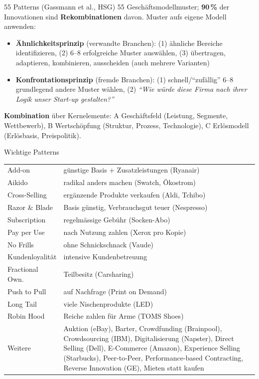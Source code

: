 \documentclass[a4paper, fontsize=7pt]{scrartcl}
\renewcommand*{\arraystretch}{1.5}  %
\begin{document}
\begin{mainbox}{55 Patterns (Gassmann et al., HSG)}
55 Geschäftsmodellmuster; \textbf{90\,\%} der Innovationen sind
\textbf{Rekombinationen} davon. Muster aufs eigene Modell anwenden:
\begin{itemize}
    \item \textbf{Ähnlichkeitsprinzip} (verwandte Branchen):
    (1) ähnliche Bereiche identifizieren, (2) 6--8 erfolgreiche Muster
    auswählen, (3) übertragen, adaptieren, kombinieren, ausscheiden
    (auch mehrere Varianten)
    \item \textbf{Konfrontationsprinzip} (fremde Branchen):
    (1) schnell/``zufällig'' 6--8 grundlegend andere Muster wählen,
    (2) \emph{``Wie würde diese Firma nach ihrer Logik unser
    Start-up gestalten?''}
\end{itemize}
\textbf{Kombination} über Kernelemente: A Geschäftsfeld (Leistung,
Segmente, Wettbewerb), B Wertschöpfung (Struktur, Prozess, Technologie),
C Erlösmodell (Erlösbasis, Preispolitik).
\end{mainbox}

\begin{mainbox}{Wichtige Patterns}
\renewcommand*{\arraystretch}{1.15}
\begin{tabularx}{\linewidth}{@{}lX@{}}
Add-on & günstige Basis + Zusatzleistungen (Ryanair) \\
Aikido & radikal anders machen (Swatch, Ökostrom) \\
Cross-Selling & ergänzende Produkte verkaufen (Aldi, Tchibo) \\
Razor \& Blade & Basis günstig, Verbrauchsgut teuer (Nespresso) \\
Subscription & regelmässige Gebühr (Socken-Abo) \\
Pay per Use & nach Nutzung zahlen (Xerox pro Kopie) \\
No Frills & ohne Schnickschnack (Vaude) \\
Kundenloyalität & intensive Kundenbetreuung \\
Fractional Own. & Teilbesitz (Carsharing) \\
Push to Pull & auf Nachfrage (Print on Demand) \\
Long Tail & viele Nischenprodukte (LED) \\
Robin Hood & Reiche zahlen für Arme (TOMS Shoes) \\
Weitere & Auktion (eBay), Barter, Crowdfunding (Brainpool),
Crowdsourcing (IBM), Digitalisierung (Napster), Direct Selling (Dell),
E-Commerce (Amazon), Experience Selling (Starbucks), Peer-to-Peer,
Performance-based Contracting, Reverse Innovation (GE), Mieten statt
kaufen \\
\end{tabularx}
\end{mainbox}
\end{document}

